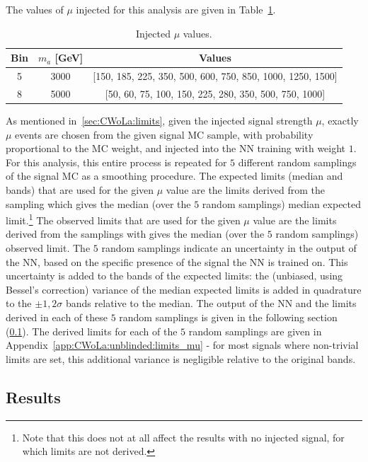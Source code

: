 The values of $\mu$ injected for this analysis are given in Table~\ref{tab:unblinded:injectedmu}.
\begin{table}[htb]
  \centering
  \caption{Injected $\mu$ values.}
  \label{tab:unblinded:injectedmu}
  \begin{tabular}{c c c}
    \hline
    Bin & $m_a$ [GeV] & Values \\ \hline
    5 & 3000 & [150, 185, 225, 350, 500, 600, 750, 850, 1000, 1250, 1500] \\
    8 & 5000 & [50, 60, 75, 100, 150, 225, 280, 350, 500, 750, 1000] \\
    \hline
  \end{tabular}
\end{table} 
As mentioned in~\ref{sec:CWoLa:limits}, given the injected signal strength $\mu$, exactly $\mu$ events are chosen from the given signal MC sample, with probability proportional to the MC weight, and injected into the NN training with weight $1$.
For this analysis, this entire process is repeated for $5$ different random samplings of the signal MC as a smoothing procedure.
The expected limits (median and bands) that are used for the given $\mu$ value are the limits derived from the sampling which gives the median (over the $5$ random samplings) median expected limit.\footnote{Note that this does not at all affect the results with no injected signal, for which limits are not derived.}
The observed limits that are used for the given $\mu$ value are the limits derived from the samplings with gives the median (over the $5$ random samplings) observed limit.
The $5$ random samplings indicate an uncertainty in the output of the NN, based on the specific presence of the signal the NN is trained on.
This uncertainty is added to the bands of the expected limits:
the (unbiased, using Bessel's correction) variance of the median expected limits is added in quadrature to the $\pm 1,2\sigma$ bands relative to the median.
The output of the NN and the limits derived in each of these $5$ random samplings is given in the following section (\ref{sec:CWoLa:unblinded:results}).
The derived limits for each of the $5$ random samplings are given in Appendix~\ref{app:CWoLa:unblinded:limits_mu} - for most signals where non-trivial limits are set, this additional variance is negligible relative to the original bands.

\subsection{Results}
\label{sec:CWoLa:unblinded:results}
